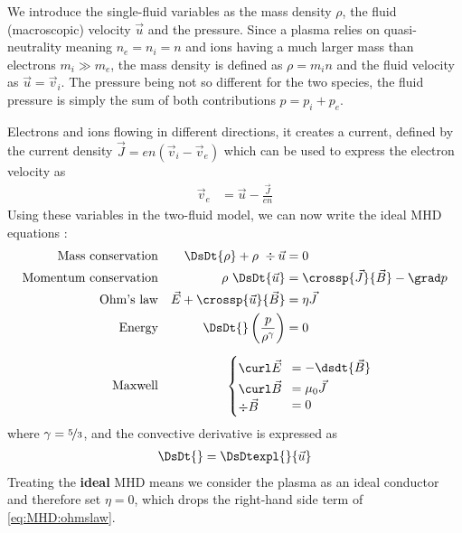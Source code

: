 We introduce the single-fluid variables as the mass density $\rho$, the fluid (macroscopic) velocity $\vec{u}$ and the pressure. Since a plasma relies on quasi-neutrality meaning $n_e = n_i = n$ and ions having a much larger mass than electrons $m_i \gg m_e$, the mass density is defined as $\rho = m_i n$ and the fluid velocity as $\vec{u} = \vec{v}_i$. The pressure being not so different for the two species, the fluid pressure is simply the sum of both contributions $p = p_i + p_e$.

Electrons and ions flowing in different directions, it creates a current, defined by the current density $\vec{J} = e n (\vec{v}_i - \vec{v}_e)$ which can be used to express the electron velocity as
\begin{align*}
	\vec{v}_e & = \vec{u} - \frac{\vec{J}}{e n}
\end{align*}
Using these variables in the two-fluid model, we can now write the ideal MHD equations \cite{freidberg}:
\begin{align}
	\textrm{Mass conservation}     && \DsDt{\rho} + \rho\ \div \vec{u}               & = 0                                     \label{eq:MHD:mass_cons}\\
	\textrm{Momentum conservation} && \rho\ \DsDt{\vec{u}}                           & = \crossp{\vec{J}}{\vec{B}} - \grad p   \label{eq:MHD:momentum_cons}\\
	\textrm{Ohm's law}             && \vec{E} + \crossp{\vec{u}}{\vec{B}}            & = \eta \vec{J}                          \label{eq:MHD:ohmslaw}\\
	\textrm{Energy}                && \DsDt{} \left( \frac{p}{\rho^{\gamma}} \right) & = 0                                     \label{eq:MHD:energy_cons}\\[2mm]
	\textrm{Maxwell}               && \begin{cases}
											\phantom{a}\\[-12pt]
											\curl \vec{E}\\[2pt]
											\curl \vec{B}\\
											\div  \vec{B}
                                      \end{cases}\!\!\!\!\! &   \begin{array}{l}
																	= - \dsdt{\vec{B}}\\[3pt]
																	= \mu_0 \vec{J}\\[1pt]
																	= 0
																\end{array}\label{eq:MHD:maxwells}
\end{align}
where $\gamma = \nicefrac{5}{3}$, and the convective derivative is expressed as
\begin{align*}
	\DsDt{} = \DsDtexpl{}{\vec{u}}
\end{align*}
Treating the \textbf{ideal} MHD means we consider the plasma as an ideal conductor and therefore set $\eta = 0$, which drops the right-hand side term of \eqref{eq:MHD:ohmslaw}.

